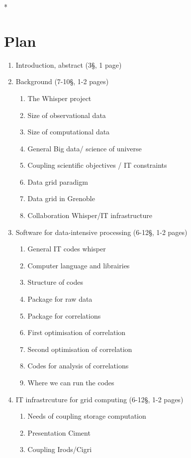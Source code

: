 \documentclass[a4paper, 10pt]{article}
\begin{document}
\begin{multicols}{2}
\/*
\section{Plan}
\begin{enumerate}
	\item Introduction, abstract (3\S , 1 page) 
  	\item Background (7-10\S, 1-2 pages)
    \begin{enumerate}
  	  \item The Whisper project
  	  \item Size of observational data
  	  \item Size of computational data
  	  \item General Big data/ science of  universe
  	  \item Coupling scientific objectives / IT constraints
  	  \item Data grid paradigm
  	  \item Data grid in Grenoble
  	  \item Collaboration Whisper/IT infrastructure
  	\end{enumerate}
  	\item Software for data-intensive processing (6-12\S , 1-2 pages)
  	\begin{enumerate}
      \item General IT codes whisper
      \item Computer language and librairies
      \item Structure of codes
      \item Package for raw data
      \item Package for correlations
      \item First optimisation of correlation
      \item Second optimisation of correlation
      \item Codes for analysis of correlations
      \item Where we can run the codes
    \end{enumerate}
  \item IT infrastrcuture for grid computing (6-12\S , 1-2 pages)
    \begin{enumerate}
  	  \item Needs of coupling storage computation
  	  \item Presentation Ciment
  	  \item Coupling Irods/Cigri

\end{enumerate}
\end{enumerate}
\end{multicols}
\end{document}
